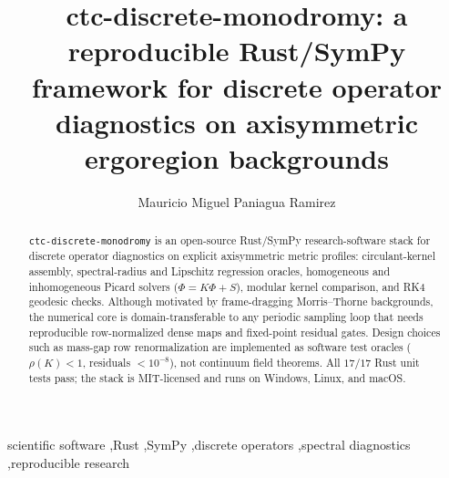 \documentclass[preprint,12pt,a4paper]{elsarticle}
\begin{document}
\renewcommand{\labelenumii}{\arabic{enumi}.\arabic{enumii}}

\begin{frontmatter}


\title{ctc-discrete-monodromy: a reproducible Rust/SymPy framework for discrete operator diagnostics on axisymmetric ergoregion backgrounds}

\author[umsn]{Mauricio Miguel Paniagua Ramirez}
\address[umsn]{Facultad de Ingenier\'ia El\'ectrica,
Universidad Michoacana de San Nicol\'as de Hidalgo (UMSNH),
Morelia, Michoac\'an, M\'exico}

\begin{abstract}
\texttt{ctc-discrete-monodromy} is an open-source Rust/SymPy research-software stack for discrete operator diagnostics on explicit axisymmetric metric profiles: circulant-kernel assembly, spectral-radius and Lipschitz regression oracles, homogeneous and inhomogeneous Picard solvers ($\Phi=K\Phi+S$), modular kernel comparison, and RK4 geodesic checks.
Although motivated by frame-dragging Morris--Thorne backgrounds, the numerical core is domain-transferable to any periodic sampling loop that needs reproducible row-normalized dense maps and fixed-point residual gates.
Design choices such as mass-gap row renormalization are implemented as software test oracles ($\rho(K)<1$, residuals $<10^{-8}$), not continuum field theorems.
All $17/17$ Rust unit tests pass; the stack is MIT-licensed and runs on Windows, Linux, and macOS.
\end{abstract}

\begin{keyword}
scientific software \sep Rust \sep SymPy \sep discrete operators \sep spectral diagnostics \sep reproducible research
\end{keyword}

\end{frontmatter}
\end{document}
